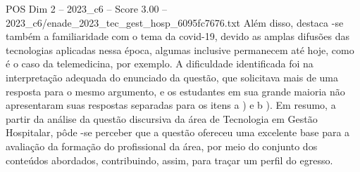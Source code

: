 \begin{textsample}{POS Dim 2 – 2023\_c6 – Score 3.00 – 2023\_c6/enade\_2023\_tec\_gest\_hosp\_6095fc7676.txt}
Além disso, destaca -se também a familiaridade com o tema da covid-19, devido as amplas difusões das tecnologias aplicadas nessa época, algumas inclusive permanecem até hoje, como é o caso da telemedicina, por exemplo.
A dificuldade identificada foi na interpretação adequada do enunciado da questão, que solicitava mais de uma resposta para o mesmo argumento, e os estudantes em sua grande maioria não apresentaram suas respostas separadas para os itens a ) e b ).
Em resumo, a partir da análise da questão discursiva da área de Tecnologia em Gestão Hospitalar, pôde -se perceber que a questão ofereceu uma excelente base para a avaliação da formação do profissional da área, por meio do conjunto dos conteúdos abordados, contribuindo, assim, para traçar um perfil do egresso.

\end{textsample}
